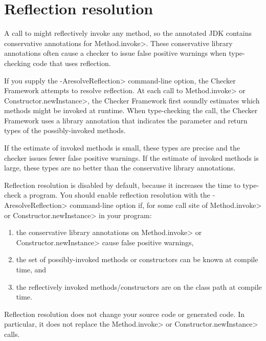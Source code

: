 \htmlhr

\def\reflectionAnno#1#2{\refqualclass{common/reflection/qual}{#1}\code{#2}}


\chapter{Reflection resolution\label{reflection-resolution}}

A call to
might reflectively invoke any method, so the annotated JDK contains
conservative annotations for \<Method.invoke>.
These conservative library annotations often cause a checker to issue false
positive warnings when type-checking code that uses reflection.

If you supply the \<-AresolveReflection> command-line option, the Checker
Framework attempts to resolve reflection.  At each call to \<Method.invoke>
or \<Constructor.newInstance>, the Checker Framework first soundly estimates
which methods might be invoked at runtime.  When type-checking the call, the
Checker Framework uses a library annotation that indicates the parameter
and return types of the possibly-invoked methods.

If the estimate of invoked methods is small, these types are precise and
the checker issues fewer false positive warnings.
If the estimate of invoked methods is large, these types are no better than the
conservative library annotations.

Reflection resolution is disabled by default, because it increases the time
to type-check a program.
You should enable reflection resolution with the \<-AresolveReflection>
command-line option if, for some call site of \<Method.invoke> or
\<Constructor.newInstance> in your program:
\begin{enumerate}
\item
  the conservative library annotations on \<Method.invoke> or
  \<Constructor.newInstance> cause false positive warnings,
\item
  the set of possibly-invoked methods or constructors can be known at
  compile time,
  and
\item
  the reflectively invoked methods/constructors are on the class path at
  compile time.
\end{enumerate}

Reflection resolution does not change your source code or generated code.
In particular, it does not replace the \<Method.invoke> or
\<Constructor.newInstance> calls.

